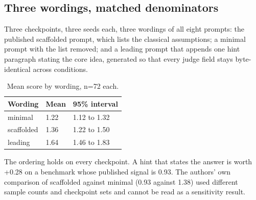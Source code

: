 
\subsection{Three wordings, matched denominators}

Three checkpoints, three seeds each, three wordings of all eight prompts: the published scaffolded prompt, which lists the classical assumptions; a minimal prompt with the list removed; and a leading prompt that appends one hint paragraph stating the core idea, generated so that every judge field stays byte-identical across conditions.

\begin{table}[t]
\caption{Mean score by wording, n=72 each.}
\begin{ruledtabular}
\begin{tabular}{lll}
Wording & Mean & 95\% interval \\
\hline
minimal & 1.22 & 1.12 to 1.32 \\
scaffolded & 1.36 & 1.22 to 1.50 \\
leading & 1.64 & 1.46 to 1.83 \\
\end{tabular}
\end{ruledtabular}
\end{table}

The ordering holds on every checkpoint. A hint that states the answer is worth +0.28 on a benchmark whose published signal is 0.93. The authors' own comparison of scaffolded against minimal (0.93 against 1.38) used different sample counts and checkpoint sets and cannot be read as a sensitivity result.
